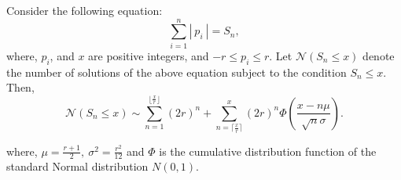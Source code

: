 \documentclass[10pt,a4paper]{amsart}
\begin{document}
	 \begin{lemma}\label{4.3}
 Consider the following equation: 	
	 	\begin{equation}
	 		\sum_{i=1}^{n} |~p_{i}~|=S_{n}, 
	 	\end{equation}
	 	where, $p_{i}$, and $x$ are positive integers, and  \( -r \leq p_i \leq r \). Let $\mathcal{N}(S_{n}\leq x) $ denote the number of solutions of the above equation subject to the condition $S_n \leq x$.  Then,  \[ \mathcal{N}(S_{n}\leq x)\sim \sum_{n=1}^{\lfloor \frac{x}{r}\rfloor}(2r)^{n}+{\sum_{n=\lceil \frac{x}{r}\rceil}^{x}(2r)^{n}\Phi\left(\frac{x-n\mu}{\sqrt{n}\sigma}\right)} .\]
	 	
	 	where, ${\mu=\frac{r+1}{2}}, ~\sigma^{2}=\frac{r^2}{12}$ and $\Phi$ is the cumulative distribution function of the standard Normal distribution $N(0,1).$
	 \end{lemma}
\end{document}
